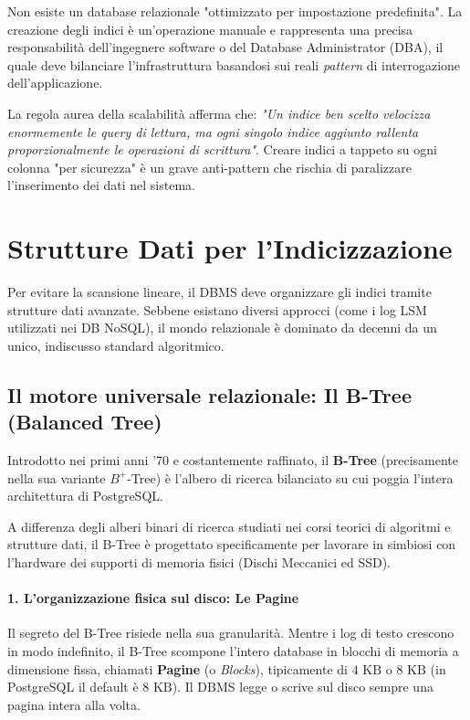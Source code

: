 Non esiste un database relazionale "ottimizzato per impostazione predefinita". La creazione degli indici è un'operazione manuale e rappresenta una precisa responsabilità dell'ingegnere software o del Database Administrator (DBA), il quale deve bilanciare l'infrastruttura basandosi sui reali \textit{pattern} di interrogazione dell'applicazione.

La regola aurea della scalabilità afferma che: \textit{"Un indice ben scelto velocizza enormemente le query di lettura, ma ogni singolo indice aggiunto rallenta proporzionalmente le operazioni di scrittura"}. Creare indici a tappeto su ogni colonna "per sicurezza" è un grave anti-pattern che rischia di paralizzare l'inserimento dei dati nel sistema.

\section{Strutture Dati per l'Indicizzazione}

Per evitare la scansione lineare, il DBMS deve organizzare gli indici tramite strutture dati avanzate. Sebbene esistano diversi approcci (come i log LSM utilizzati nei DB NoSQL), il mondo relazionale è dominato da decenni da un unico, indiscusso standard algoritmico.

\subsection{Il motore universale relazionale: Il B-Tree (Balanced Tree)}

Introdotto nei primi anni '70 e costantemente raffinato, il \textbf{B-Tree} (precisamente nella sua variante $B^+$-Tree) è l'albero di ricerca bilanciato su cui poggia l'intera architettura di PostgreSQL. 

A differenza degli alberi binari di ricerca studiati nei corsi teorici di algoritmi e strutture dati, il B-Tree è progettato specificamente per lavorare in simbiosi con l'hardware dei supporti di memoria fisici (Dischi Meccanici ed SSD).

\paragraph{1. L'organizzazione fisica sul disco: Le Pagine}

Il segreto del B-Tree risiede nella sua granularità. Mentre i log di testo crescono in modo indefinito, il B-Tree scompone l'intero database in blocchi di memoria a dimensione fissa, chiamati \textbf{Pagine} (o \textit{Blocks}), tipicamente di $4\text{ KB}$ o $8\text{ KB}$ (in PostgreSQL il default è $8\text{ KB}$). Il DBMS legge o scrive sul disco sempre una pagina intera alla volta.

